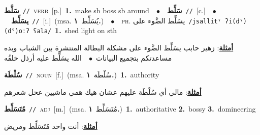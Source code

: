 \documentclass[10pt,a4paper,twoside]{article} %
\begin{document}
\begin{multicols}{2}
{\setlength\topsep{0pt}\textbf{\foreignlanguage{arabic}{سَلَّط}}\ {\color{gray}\texttt{//}\color{black}}\ \textsc{verb}\ [p.]\ \textbf{1.}~make sb boss sb around\ \ $\bullet$\ \ \setlength\topsep{0pt}\textbf{\foreignlanguage{arabic}{سَلِّط}}\ {\color{gray}\texttt{//}\color{black}}\ [c.]\ \ $\bullet$\ \ \setlength\topsep{0pt}\textbf{\foreignlanguage{arabic}{يسَلِّط}}\ {\color{gray}\texttt{//}\color{black}}\ [i.]\ \color{gray}(msa. \foreignlanguage{arabic}{يُسَلِّط}~\foreignlanguage{arabic}{\textbf{١.}})\color{black}\ \ $\bullet$\ \ \textsc{ph.} \color{gray} \foreignlanguage{arabic}{يسَلِّط الضَّوء على}\color{black}\ {\color{gray}\texttt{/{\sffamily jsallitˤ ʔi(dˤ)(dˤ)oːʔ ʕala}/}\color{black}}\ \textbf{1.}~shed light on sth\  \begin{flushright}\color{gray}\foreignlanguage{arabic}{\textbf{\underline{\foreignlanguage{arabic}{أمثلة}}}: زهير حابب يسَلِّط الضَّوء على مشكلة البطالة المنتشرة بين الشباب وبده مساعدتكم بتجميع البيانات\ $\bullet$\ \  الله يسَلِّط عليه أرذل خلقُه}\end{flushright}\color{black}} \vspace{2mm}

{\setlength\topsep{0pt}\textbf{\foreignlanguage{arabic}{سُلْطَة}}\ {\color{gray}\texttt{//}\color{black}}\ \textsc{noun}\ [f.]\ \color{gray}(msa. \foreignlanguage{arabic}{سُلْطَة}~\foreignlanguage{arabic}{\textbf{١.}})\color{black}\ \textbf{1.}~authority\  \begin{flushright}\color{gray}\foreignlanguage{arabic}{\textbf{\underline{\foreignlanguage{arabic}{أمثلة}}}: مالي أي سُلْطَة عليهم عشان هيك همي ماشيين عحل شعرهم}\end{flushright}\color{black}} \vspace{2mm}

{\setlength\topsep{0pt}\textbf{\foreignlanguage{arabic}{مُتَسَلِّط}}\ {\color{gray}\texttt{//}\color{black}}\ \textsc{adj}\ [m.]\ \color{gray}(msa. \foreignlanguage{arabic}{مُتَسَلِّط}~\foreignlanguage{arabic}{\textbf{١.}})\color{black}\ \textbf{1.}~authoritative  \textbf{2.}~bossy  \textbf{3.}~domineering\  \begin{flushright}\color{gray}\foreignlanguage{arabic}{\textbf{\underline{\foreignlanguage{arabic}{أمثلة}}}: أنت واحد مُتَسَلِّط ومريض}\end{flushright}\color{black}} \vspace{2mm}


\end{multicols}
\end{document}
